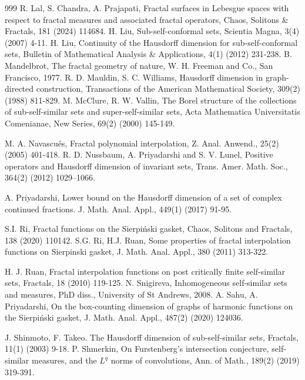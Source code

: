 \documentclass[12pt,oneside,reqno]{amsart}
\theoremstyle{definition}
\theoremstyle{remark}
\begin{document}
\begin{thebibliography}{999}
 R. Lal, S. Chandra, A. Prajapati, Fractal surfaces in Lebesgue spaces with respect to fractal measures and associated fractal operators, Chaos, Solitons \& Fractals, 181 (2024) 114684.
 H. Liu, Sub-self-conformal sets, Scientia Magna, 3(4) (2007) 4-11.
    H. Liu, Continuity of the Hausdorff dimension for sub-self-conformal sets, Bulletin of Mathematical Analysis \& Applications, 4(1) (2012) 231-238.
 B. Mandelbrot, The fractal geometry of nature, W. H. Freeman and Co., San Francisco, 1977.
 R. D. Mauldin, S. C. Williams, Hausdorff dimension in graph-directed construction, Transactions of the American Mathematical Society, 309(2) (1988) 811-829.
  M. McClure, R. W. Vallin, The Borel structure of the collections of sub-self-similar sets and super-self-similar sets, Acta Mathematica Universitatis Comenianae, New Series, 69(2) (2000) 145-149.


 M. A. Navascu\'es, Fractal polynomial interpolation, Z. Anal. Anwend., 25(2) (2005) 401-418.
 R. D. Nussbaum, A. Priyadarshi and S. V. Lunel, Positive operators and Hausdorff dimension of invariant sets, Trans. Amer. Math. Soc., 364(2) (2012) 1029–1066.
 
 A. Priyadarshi, Lower bound on the Hausdorff dimension of a set of complex continued fractions. J. Math. Anal. Appl., 449(1) (2017) 91-95.


 S.I. Ri, Fractal functions on the Sierpi\'nski gasket, Chaos, Solitons and Fractals, 138 (2020) 110142.
 S.G. Ri, H.J. Ruan, Some properties of fractal interpolation functions on Sierpinski gasket, J. Math. Anal. Appl., 380 (2011) 313-322.

 H. J. Ruan, Fractal interpolation functions on post critically finite self-similar sets, Fractals, 18 (2010) 119-125.
 N. Snigireva, Inhomogeneous self-similar sets and measures, PhD diss., University of St Andrews, 2008.
 A. Sahu, A. Priyadarshi, On the box-counting dimension of graphs of harmonic functions on the Sierpi\'{n}ski gasket, J. Math. Anal. Appl., 487(2) (2020) 124036. 

 J. Shinmoto, F. Takeo. The Hausdorff dimension of sub-self-similar sets, Fractals, 11(1) (2003) 9-18.
 P. Shmerkin, On Furstenberg's intersection conjecture, self-similar measures, and the $L^q$ norms of convolutions, Ann. of Math., 189(2) (2019) 319-391.


\end{thebibliography}
\end{document}
